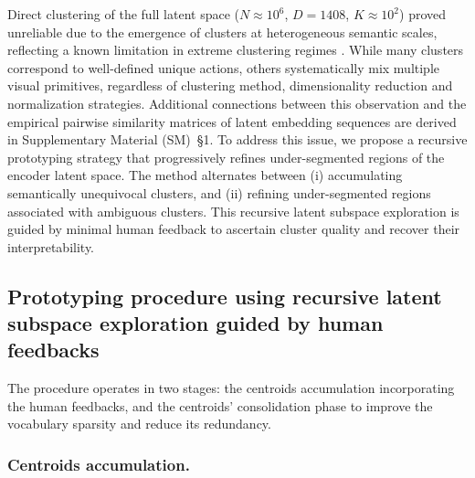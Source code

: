 \documentclass[runningheads]{llncs}
\begin{document}
Direct clustering of the full latent space ($N\!\approx 10^6$, $D=1408$, $K\approx 10^{2}$) proved unreliable due to the emergence of clusters at heterogeneous semantic scales, reflecting a known limitation in extreme clustering regimes \cite{10.1145/3097983.3098079}. While many clusters correspond to well-defined unique actions, others systematically mix multiple visual primitives, regardless of clustering method, dimensionality reduction and normalization strategies. Additional connections between this observation and the empirical pairwise similarity matrices of latent embedding sequences are derived in Supplementary Material (SM)~\S1. To address this issue, we propose a recursive prototyping strategy that progressively refines under-segmented regions of the encoder latent space. The method alternates between (i) accumulating semantically unequivocal clusters, and (ii) refining under-segmented regions associated with ambiguous clusters. This recursive latent subspace exploration is guided by minimal human feedback to ascertain cluster quality and recover their interpretability. 

\subsection{Prototyping procedure using recursive latent subspace exploration guided by human feedbacks}

 The procedure operates in two stages: the centroids accumulation incorporating the human feedbacks, and the centroids' consolidation phase to improve the vocabulary sparsity and reduce its redundancy.

    \subsubsection{Centroids accumulation.}
\end{document}
